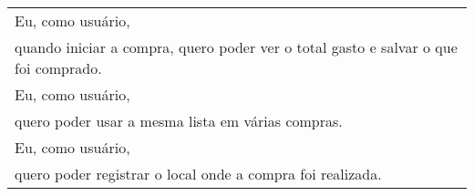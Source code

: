 \begin{quadro}[H]
{\begin{tabular}{|l|}
Eu, como usuário, \\ quando iniciar a compra, quero poder ver o total gasto e salvar o que foi comprado.                                         \\ \hline
Eu, como usuário, \\ quero poder usar a mesma lista em várias compras.                                                                           \\ \hline
Eu, como usuário, \\ quero poder registrar o local onde a compra foi realizada.                                                                  \\ \hline
\end{tabular}%
}
\end{quadro}
                                                               
